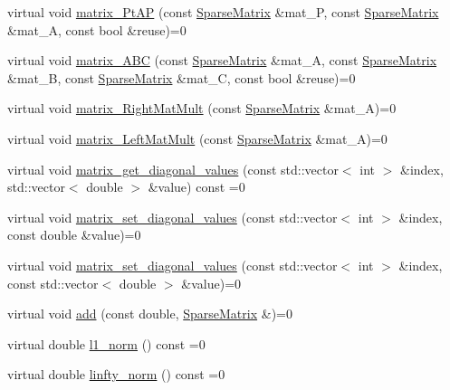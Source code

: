 \begin{DoxyCompactItemize}
virtual void \mbox{\hyperlink{classfemus_1_1_sparse_matrix_a34612571c3699c86b6aab520f57bc247}{matrix\+\_\+\+Pt\+AP}} (const \mbox{\hyperlink{classfemus_1_1_sparse_matrix}{Sparse\+Matrix}} \&mat\+\_\+P, const \mbox{\hyperlink{classfemus_1_1_sparse_matrix}{Sparse\+Matrix}} \&mat\+\_\+A, const bool \&reuse)=0
\item 
virtual void \mbox{\hyperlink{classfemus_1_1_sparse_matrix_abdc431f03e72c3a96ee32aec82b33180}{matrix\+\_\+\+A\+BC}} (const \mbox{\hyperlink{classfemus_1_1_sparse_matrix}{Sparse\+Matrix}} \&mat\+\_\+A, const \mbox{\hyperlink{classfemus_1_1_sparse_matrix}{Sparse\+Matrix}} \&mat\+\_\+B, const \mbox{\hyperlink{classfemus_1_1_sparse_matrix}{Sparse\+Matrix}} \&mat\+\_\+C, const bool \&reuse)=0
\item 
virtual void \mbox{\hyperlink{classfemus_1_1_sparse_matrix_ae28bac18dd1ec48ef2700be0b8da7578}{matrix\+\_\+\+Right\+Mat\+Mult}} (const \mbox{\hyperlink{classfemus_1_1_sparse_matrix}{Sparse\+Matrix}} \&mat\+\_\+A)=0
\item 
virtual void \mbox{\hyperlink{classfemus_1_1_sparse_matrix_a3e1f15fab373572ab98205ca5b115815}{matrix\+\_\+\+Left\+Mat\+Mult}} (const \mbox{\hyperlink{classfemus_1_1_sparse_matrix}{Sparse\+Matrix}} \&mat\+\_\+A)=0
\item 
virtual void \mbox{\hyperlink{classfemus_1_1_sparse_matrix_a1f224c61d45050fc66e99dc2958abc70}{matrix\+\_\+get\+\_\+diagonal\+\_\+values}} (const std\+::vector$<$ int $>$ \&index, std\+::vector$<$ double $>$ \&value) const =0
\item 
virtual void \mbox{\hyperlink{classfemus_1_1_sparse_matrix_ac3943644cb4800d530b650a97732fefc}{matrix\+\_\+set\+\_\+diagonal\+\_\+values}} (const std\+::vector$<$ int $>$ \&index, const double \&value)=0
\item 
virtual void \mbox{\hyperlink{classfemus_1_1_sparse_matrix_a9f5b60f4154133a07eddeb67cb5a3650}{matrix\+\_\+set\+\_\+diagonal\+\_\+values}} (const std\+::vector$<$ int $>$ \&index, const std\+::vector$<$ double $>$ \&value)=0
\item 
virtual void \mbox{\hyperlink{classfemus_1_1_sparse_matrix_aebfeb2086e9673a430003a33c4e7c2c0}{add}} (const double, \mbox{\hyperlink{classfemus_1_1_sparse_matrix}{Sparse\+Matrix}} \&)=0
\item 
virtual double \mbox{\hyperlink{classfemus_1_1_sparse_matrix_acc8203f7ddcf5d4961c337070093ff69}{l1\+\_\+norm}} () const =0
\item 
virtual double \mbox{\hyperlink{classfemus_1_1_sparse_matrix_a6b28e0a2be2d697e0cdd2c5fd08d18aa}{linfty\+\_\+norm}} () const =0

\end{DoxyCompactItemize}
